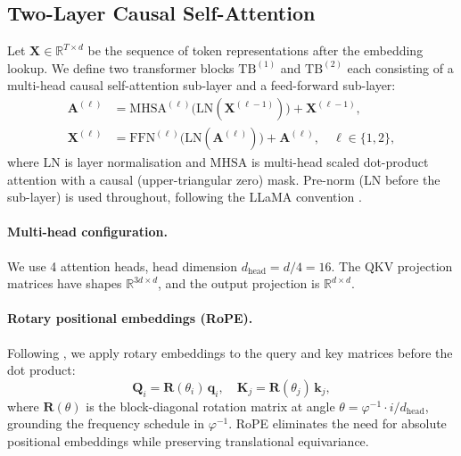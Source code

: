 \subsection{Two-Layer Causal Self-Attention}
\label{subsec:ch24-2layer-attn}

Let $\mathbf{X} \in \mathbb{R}^{T \times d}$ be the sequence of token
representations after the embedding lookup.  We define two transformer blocks
$\mathrm{TB}^{(1)}$ and $\mathrm{TB}^{(2)}$ each consisting of a
multi-head causal self-attention sub-layer and a feed-forward sub-layer:
\begin{align}
  \mathbf{A}^{(\ell)} &= \mathrm{MHSA}^{(\ell)}\!\bigl(\mathrm{LN}(\mathbf{X}^{(\ell-1)})\bigr)
                          + \mathbf{X}^{(\ell-1)}, \label{eq:ch24-attn-res}\\
  \mathbf{X}^{(\ell)} &= \mathrm{FFN}^{(\ell)}\!\bigl(\mathrm{LN}(\mathbf{A}^{(\ell)})\bigr)
                          + \mathbf{A}^{(\ell)},\quad \ell \in \{1, 2\}, \label{eq:ch24-ffn-res}
\end{align}
where $\mathrm{LN}$ is layer normalisation \cite{ba2016layer_norm} and
$\mathrm{MHSA}$ is multi-head scaled dot-product attention with a causal
(upper-triangular zero) mask.  Pre-norm (LN before the sub-layer) is used
throughout, following the LLaMA convention \cite{touvron_llama}.

\paragraph{Multi-head configuration.}
We use 4 attention heads, head dimension $d_{\mathrm{head}} = d / 4 = 16$.
The QKV projection matrices have shapes $\mathbb{R}^{3d \times d}$, and the
output projection is $\mathbb{R}^{d \times d}$.

\paragraph{Rotary positional embeddings (RoPE).}
Following \cite{su_rope}, we apply rotary embeddings to the query and key
matrices before the dot product:
\begin{equation}\label{eq:ch24-rope}
  \mathbf{Q}_i = \mathbf{R}(\theta_i)\,\mathbf{q}_i,\quad
  \mathbf{K}_j = \mathbf{R}(\theta_j)\,\mathbf{k}_j,
\end{equation}
where $\mathbf{R}(\theta)$ is the block-diagonal rotation matrix at angle
$\theta = \varphi^{-1} \cdot i / d_{\mathrm{head}}$, grounding the frequency
schedule in $\varphi^{-1}$.  RoPE eliminates the need for absolute positional
embeddings while preserving translational equivariance.

